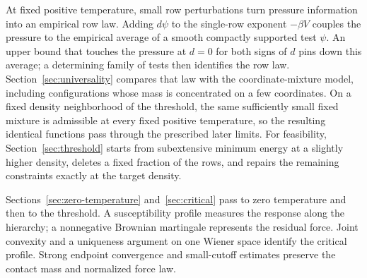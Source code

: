 \documentclass[11pt,a4paper]{article}
\numberwithin{equation}{section}
\theoremstyle{definition}
\theoremstyle{remark}
\begin{document}
At fixed positive temperature, small row perturbations turn pressure
information into an empirical row law.  Adding $d\psi$ to the single-row exponent $-\beta V$
couples the pressure to the empirical average of a smooth compactly
supported test $\psi$.  An upper bound that touches the pressure at $d=0$
for both signs of $d$ pins down this average; a determining family of tests
then identifies the row law.  Section~\ref{sec:universality} compares that
law with the coordinate-mixture model, including configurations whose mass
is concentrated on a few coordinates.  On a fixed density neighborhood of
the threshold, the same sufficiently small fixed mixture is admissible at
every fixed positive temperature, so the resulting identical functions
pass through the prescribed later limits.  For
feasibility, Section~\ref{sec:threshold} starts from subextensive minimum
energy at a slightly higher density, deletes a fixed fraction of the rows,
and repairs the remaining constraints exactly at the target density.

Sections~\ref{sec:zero-temperature} and~\ref{sec:critical} pass to zero
temperature and then to the threshold.  A susceptibility profile measures
the response along the hierarchy; a nonnegative Brownian martingale
represents the residual force.  Joint convexity and a uniqueness argument
on one Wiener space identify the critical profile.  Strong endpoint
convergence and small-cutoff estimates preserve the contact mass and
normalized force law.
\end{document}
